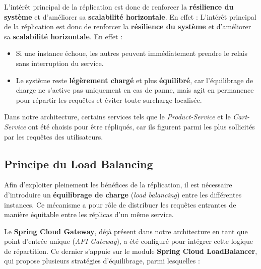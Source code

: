 L'intérêt principal de la réplication est donc de renforcer la \textbf{résilience du système} et d'améliorer sa \textbf{scalabilité horizontale}. En effet :
L'intérêt principal de la réplication est donc de renforcer la \textbf{résilience du système} et d'améliorer sa \textbf{scalabilité horizontale}. En effet :
\begin{itemize}
    \item Si une instance échoue, les autres peuvent immédiatement prendre le relais sans interruption du service.
    \item Le système reste \textbf{légèrement chargé} et plus \textbf{équilibré}, car l'équilibrage de charge ne s'active pas uniquement en cas de panne, mais agit en permanence pour répartir les requêtes et éviter toute surcharge localisée.
\end{itemize}

Dans notre architecture, certains services tels que le \textit{Product-Service} et le \textit{Cart-Service} ont été choisis pour être répliqués, car ils figurent parmi les plus sollicités par les requêtes des utilisateurs.  

\subsection{Principe du Load Balancing}
Afin d'exploiter pleinement les bénéfices de la réplication, il est nécessaire d'introduire un \textbf{équilibrage de charge} (\textit{load balancing}) entre les différentes instances. Ce mécanisme a pour rôle de distribuer les requêtes entrantes de manière équitable entre les réplicas d'un même service.

Le \textbf{Spring Cloud Gateway}, déjà présent dans notre architecture en tant que point d'entrée unique (\textit{API Gateway}), a été configuré pour intégrer cette logique de répartition.  
Ce dernier s'appuie sur le module \textbf{Spring Cloud LoadBalancer}, qui propose plusieurs stratégies d'équilibrage, parmi lesquelles :

